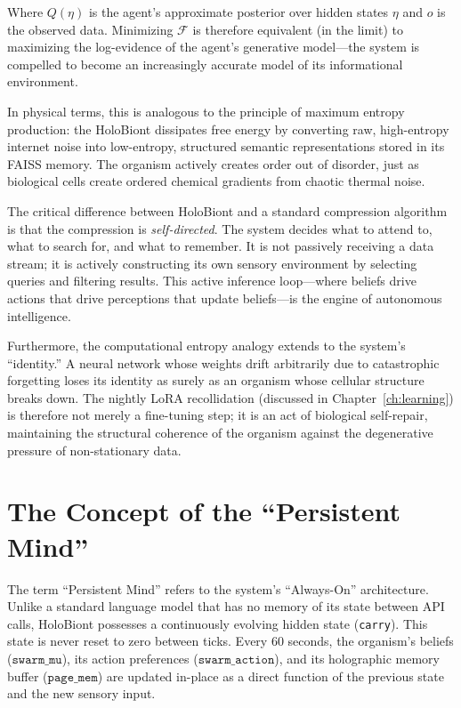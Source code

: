 Where $Q(\eta)$ is the agent's approximate posterior over hidden states $\eta$ and $o$ is the observed data. Minimizing $\mathcal{F}$ is therefore equivalent (in the limit) to maximizing the log-evidence of the agent's generative model---the system is compelled to become an increasingly accurate model of its informational environment.

In physical terms, this is analogous to the principle of maximum entropy production: the HoloBiont dissipates free energy by converting raw, high-entropy internet noise into low-entropy, structured semantic representations stored in its FAISS memory. The organism actively creates order out of disorder, just as biological cells create ordered chemical gradients from chaotic thermal noise.

The critical difference between HoloBiont and a standard compression algorithm is that the compression is \textit{self-directed}. The system decides what to attend to, what to search for, and what to remember. It is not passively receiving a data stream; it is actively constructing its own sensory environment by selecting queries and filtering results. This active inference loop---where beliefs drive actions that drive perceptions that update beliefs---is the engine of autonomous intelligence.

Furthermore, the computational entropy analogy extends to the system's ``identity.'' A neural network whose weights drift arbitrarily due to catastrophic forgetting loses its identity as surely as an organism whose cellular structure breaks down. The nightly LoRA recollidation (discussed in Chapter~\ref{ch:learning}) is therefore not merely a fine-tuning step; it is an act of biological self-repair, maintaining the structural coherence of the organism against the degenerative pressure of non-stationary data.

\section{The Concept of the ``Persistent Mind''}

The term ``Persistent Mind'' refers to the system's ``Always-On'' architecture. Unlike a standard language model that has no memory of its state between API calls, HoloBiont possesses a continuously evolving hidden state (\texttt{carry}). This state is never reset to zero between ticks. Every 60 seconds, the organism's beliefs ($\mathtt{swarm\_mu}$), its action preferences ($\mathtt{swarm\_action}$), and its holographic memory buffer ($\mathtt{page\_mem}$) are updated in-place as a direct function of the previous state and the new sensory input.

